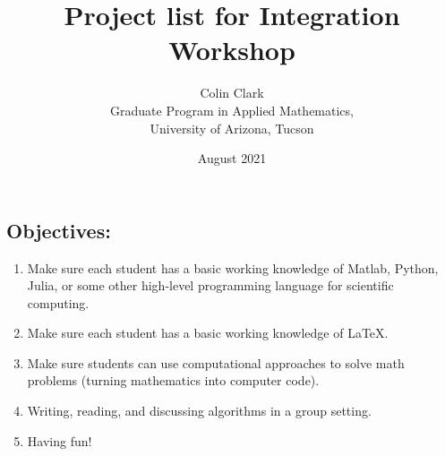 \documentclass[11pt,oneside]{article}
\title{ Project list for Integration Workshop}
\author{Colin Clark \\  Graduate Program in Applied Mathematics,\\ University of Arizona, Tucson}
\date{August 2021}
\theoremstyle{definition}
\theoremstyle{definition}
\theoremstyle{remark}
\numberwithin{equation}{section}
\begin{document}
\maketitle


\subsection*{Objectives:}
\begin{enumerate}
\item Make sure each student has a basic working knowledge of Matlab, Python, Julia, or some other high-level programming language for scientific computing.
\item Make sure each student has a basic working knowledge of \LaTeX.
\item Make sure students can use computational approaches to solve math problems (turning mathematics into computer code).
\item Writing, reading, and discussing algorithms in a group setting.
\item Having fun!
\end{enumerate}

\newpage


\newpage


\newpage


\newpage



\newpage


\newpage


\newpage


\newpage
\end{document}
